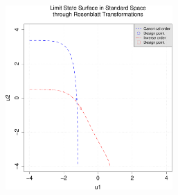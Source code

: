 {              \begin{center}
                \includegraphics[height=7cm]{Figures/Final_SEL_ex2_marginExp.pdf}
              \end{center}



            }
